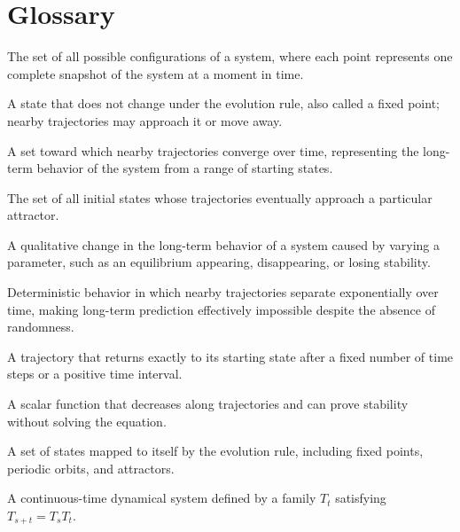 \section*{Glossary}
\begin{description}[leftmargin=*,style=nextline,itemsep=0.3em]
\item[\textbf{State space.}] The set of all possible configurations of a system, where each point represents one complete snapshot of the system at a moment in time.
\item[\textbf{Equilibrium.}] A state that does not change under the evolution rule, also called a fixed point; nearby trajectories may approach it or move away.
\item[\textbf{Attractor.}] A set toward which nearby trajectories converge over time, representing the long-term behavior of the system from a range of starting states.
\item[\textbf{Basin of attraction.}] The set of all initial states whose trajectories eventually approach a particular attractor.
\item[\textbf{Bifurcation.}] A qualitative change in the long-term behavior of a system caused by varying a parameter, such as an equilibrium appearing, disappearing, or losing stability.
\item[\textbf{Chaos.}] Deterministic behavior in which nearby trajectories separate exponentially over time, making long-term prediction effectively impossible despite the absence of randomness.
\item[\textbf{Periodic orbit.}] A trajectory that returns exactly to its starting state after a fixed number of time steps or a positive time interval.
\item[\textbf{Lyapunov function.}] A scalar function that decreases along trajectories and can prove stability without solving the equation.
\item[\textbf{Invariant set.}] A set of states mapped to itself by the evolution rule, including fixed points, periodic orbits, and attractors.
\item[\textbf{Flow.}] A continuous-time dynamical system defined by a family $T_t$ satisfying $T_{s+t}=T_sT_t$.
\end{description}

